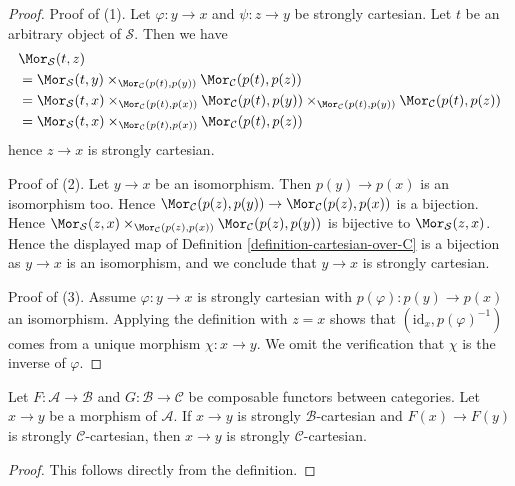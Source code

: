 \begin{proof}
Proof of (1). Let $\varphi : y \to x$ and $\psi : z \to y$ be
strongly cartesian. Let $t$ be an arbitrary object of $\mathcal{S}$.
Then we have
\begin{align*}
& \Mor_\mathcal{S}(t, z) \\
& =
\Mor_\mathcal{S}(t, y)
\times_{\Mor_\mathcal{C}(p(t), p(y))}
\Mor_\mathcal{C}(p(t), p(z)) \\
& =
\Mor_\mathcal{S}(t, x)
\times_{\Mor_\mathcal{C}(p(t), p(x))}
\Mor_\mathcal{C}(p(t), p(y))
\times_{\Mor_\mathcal{C}(p(t), p(y))}
\Mor_\mathcal{C}(p(t), p(z)) \\
& =
\Mor_\mathcal{S}(t, x)
\times_{\Mor_\mathcal{C}(p(t), p(x))}
\Mor_\mathcal{C}(p(t), p(z))
\end{align*}
hence $z \to x$ is strongly cartesian.

\medskip\noindent
Proof of (2). Let $y \to x$ be an isomorphism. Then $p(y) \to p(x)$
is an isomorphism too. Hence
$\Mor_\mathcal{C}(p(z), p(y)) \to
\Mor_\mathcal{C}(p(z), p(x))$
is a bijection. Hence
$\Mor_\mathcal{S}(z, x)
\times_{\Mor_\mathcal{C}(p(z), p(x))}
\Mor_\mathcal{C}(p(z), p(y))$ is bijective to
$\Mor_\mathcal{S}(z, x)$.
Hence the displayed map of
Definition \ref{definition-cartesian-over-C}
is a bijection as $y \to x$ is an isomorphism, and we conclude that
$y \to x$ is strongly cartesian.

\medskip\noindent
Proof of (3). Assume $\varphi : y \to x$ is strongly cartesian with
$p(\varphi) : p(y) \to p(x)$ an isomorphism. Applying the definition with
$z = x$ shows that $(\text{id}_x, p(\varphi)^{-1})$ comes from a unique
morphism $\chi : x \to y$. We omit the verification that $\chi$ is the
inverse of $\varphi$.
\end{proof}

\begin{lemma}
\label{lemma-cartesian-over-cartesian}
Let $F : \mathcal{A} \to \mathcal{B}$ and $G : \mathcal{B} \to \mathcal{C}$
be composable functors between categories. Let $x \to y$ be a morphism of
$\mathcal{A}$. If $x \to y$ is strongly $\mathcal{B}$-cartesian
and $F(x) \to F(y)$ is strongly $\mathcal{C}$-cartesian, then
$x \to y$ is strongly $\mathcal{C}$-cartesian.
\end{lemma}

\begin{proof}
This follows directly from the definition.
\end{proof}

